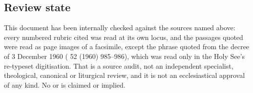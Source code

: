 \subsection{Review state}

This document has been internally checked against the sources named above:
every numbered rubric cited was read at its own locus, and the passages quoted
were read as page images of a facsimile, except the phrase quoted from the
decree of 3 December 1960 ( 52 (1960) 985--986),
which was read only in the Holy See's re-typeset digitisation. That is a source audit, not an independent
specialist, theological, canonical or liturgical review, and it is not an
ecclesiastical approval of any kind. No  or  is claimed or implied.
